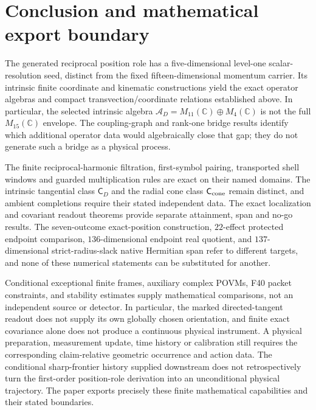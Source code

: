 \documentclass[12pt,a4paper]{article}
\begin{document}


\section{Conclusion and mathematical export boundary}
\label{p2c:sec:final-conclusion}
The generated reciprocal position role has a five-dimensional level-one
scalar-resolution seed, distinct from the fixed fifteen-dimensional
momentum carrier. Its intrinsic finite coordinate and kinematic
constructions yield the exact operator algebras and compact
transvection/coordinate relations established above. In particular, the
selected intrinsic algebra $\mathcal A_D=M_{11}(\mathbb C)\oplus
M_4(\mathbb C)$ is not the full $M_{15}(\mathbb C)$ envelope. The
coupling-graph and rank-one bridge results identify which additional
operator data would algebraically close that gap; they do not generate
such a bridge as a physical process.

The finite reciprocal-harmonic filtration, first-symbol pairing,
transported shell windows and guarded multiplication rules are exact
on their named domains. The intrinsic tangential class $\mathsf C_D$
and the radial cone class $\mathsf C_{\rm cone}$ remain distinct, and
ambient completions require their stated independent data.
The exact localization and covariant readout theorems provide
separate attainment, span and no-go results. The seven-outcome
exact-position construction, $22$-effect protected endpoint comparison,
$136$-dimensional endpoint real quotient, and $137$-dimensional
strict-radius-slack native Hermitian span refer to different targets,
and none of these numerical statements can be substituted for another.

Conditional exceptional finite frames, auxiliary complex POVMs,
F40 packet constraints, and stability estimates supply mathematical
comparisons, not an independent source or detector. In particular,
the marked directed-tangent readout does not supply its own globally
chosen orientation, and finite exact covariance alone does not produce
a continuous physical instrument. A physical preparation, measurement
update, time history or calibration still requires the corresponding
claim-relative geometric occurrence and action data. The conditional
sharp-frontier history supplied downstream does not retrospectively
turn the first-order position-role derivation into an unconditional
physical trajectory. The paper exports precisely these finite
mathematical capabilities and their stated boundaries.
\end{document}
